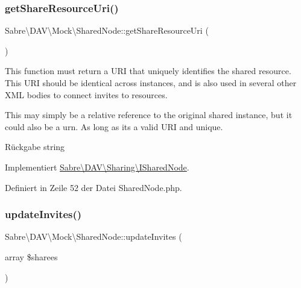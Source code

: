 \subsubsection{\texorpdfstring{get\+Share\+Resource\+Uri()}{getShareResourceUri()}}
{\footnotesize\ttfamily Sabre\textbackslash{}\+D\+A\+V\textbackslash{}\+Mock\textbackslash{}\+Shared\+Node\+::get\+Share\+Resource\+Uri (\begin{DoxyParamCaption}{ }\end{DoxyParamCaption})}

This function must return a U\+RI that uniquely identifies the shared resource. This U\+RI should be identical across instances, and is also used in several other X\+ML bodies to connect invites to resources.

This may simply be a relative reference to the original shared instance, but it could also be a urn. As long as it\textquotesingle{}s a valid U\+RI and unique.

\begin{DoxyReturn}{Rückgabe}
string 
\end{DoxyReturn}


Implementiert \mbox{\hyperlink{interface_sabre_1_1_d_a_v_1_1_sharing_1_1_i_shared_node_a54b1073bfc389995c722566e18426902}{Sabre\textbackslash{}\+D\+A\+V\textbackslash{}\+Sharing\textbackslash{}\+I\+Shared\+Node}}.



Definiert in Zeile 52 der Datei Shared\+Node.\+php.

\mbox{\label{class_sabre_1_1_d_a_v_1_1_mock_1_1_shared_node_a4dfbf2b033295cd266b532d7fcaed18c}} 
\subsubsection{\texorpdfstring{update\+Invites()}{updateInvites()}}
{\footnotesize\ttfamily Sabre\textbackslash{}\+D\+A\+V\textbackslash{}\+Mock\textbackslash{}\+Shared\+Node\+::update\+Invites (\begin{DoxyParamCaption}\item[{array}]{\$sharees }\end{DoxyParamCaption})}

